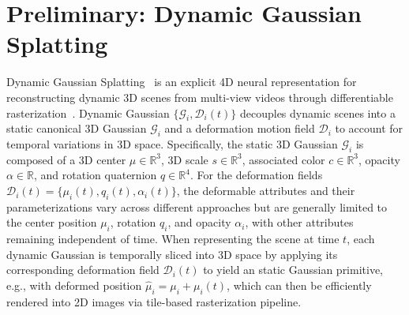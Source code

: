 \vspace{-2mm}
\section{Preliminary: Dynamic Gaussian Splatting}
Dynamic Gaussian Splatting~\cite{yang2024deformable, wu20244d, duan20244d, katsumata2025compact, kratimenos2025dynmf, yang2023real} is an explicit 4D neural representation for reconstructing dynamic 3D scenes from multi-view videos through differentiable rasterization~\cite{kerbl20233d}. Dynamic Gaussian ${\{\mathcal{G}_{i}, \mathcal{D}_{i}(t)}\}$ decouples dynamic scenes into a static canonical 3D Gaussian $\mathcal{G}_i$ and a deformation motion field $\mathcal{D}_i$ to account for temporal variations in 3D space. Specifically, the static 3D Gaussian $\mathcal{G}_{i}$ is composed of a 3D center $\mu \in \mathbb{R}^3$,  3D scale $s \in \mathbb{R}^3$, associated color $c \in \mathbb{R}^3$, opacity $\alpha \in \mathbb{R}$, and rotation quaternion $q \in \mathbb{R}^4$. 
%
% 
For the deformation fields $\mathcal{D}_{i}(t) = \{\mu_i(t), q_i(t), \alpha_i(t)\}$, the deformable attributes and their parameterizations vary across different approaches but are generally limited to the center position $\mu_i$, rotation $q_i$, and opacity $\alpha_i$, with other attributes remaining independent of time.
When representing the scene at time $t$, each dynamic Gaussian is temporally sliced into 3D space by applying its corresponding deformation field $\mathcal{D}_{i}(t)$ to yield an static Gaussian primitive, e.g., with deformed position $\hat{\mu}_i = \mu_i + \mu_i(t)$, which can then be efficiently rendered into 2D images via tile-based rasterization pipeline.





\vspace{-1.5mm}

